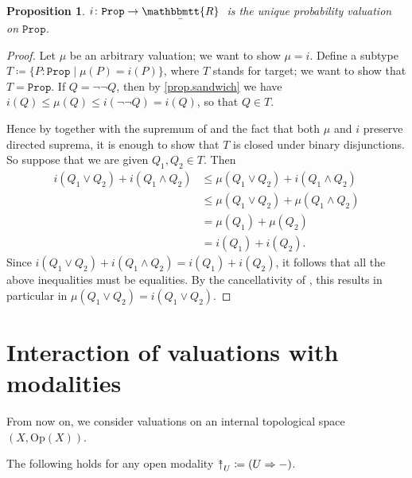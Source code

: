 \documentclass[11pt, oneside, article]{memoir}
\theoremstyle{plain}
\newtheorem{proposition}[theorem]{Proposition}
\theoremstyle{definition}
\theoremstyle{remark}
\newcommand{\const}[1]{\mathtt{#1}}
\newcommand{\Set}[1]{\mathrm{#1}}
\newcommand{\ubar}[1]{\underaccent{\bar}{#1}}
\newcommand{\internal}[1]{\raisebox{-.03ex}{$\mathbbmtt{#1}$}}
\newcommand{\hs}{\hspace{1.1pt}}
\newcommand{\tRR}{\internal{R}\hs}
\newcommand{\tLR}{\ubar{\tRR}\hs}
\newcommand{\Prop}{\const{Prop}}
\newcommand{\Op}{\Set{Op}}
\newcommand{\InSymbol}{{\upclose}}%
\newcommand{\In}[2][]{\InSymbol^{#1}_{#2}}
\newcommand{\upclose}{{\rotatebox[origin=c]{90}{$\twoheadrightarrow$}}}
\newcommand{\imp}{\Rightarrow}
\begin{document}
\begin{proposition}\label{prop.unique_probability_valuation_on_prop}
$i\colon\Prop\to\tLR$ is the unique probability valuation on $\Prop$. 
\end{proposition}

\begin{proof}
Let $\mu$ be an arbitrary valuation; we want to show $\mu=i$. Define a subtype $T\coloneqq\{P:\Prop\mid\mu(P)=i(P)\}$, where $T$ stands for target; we want to show that $T=\Prop$. If $Q = \neg\neg Q$, then by \cref{prop.sandwich} we have $i(Q)\leq\mu(Q)\leq i(\neg\neg Q)=i(Q)$, so that $Q\in T$.

Hence by  together with the supremum of  and the fact that both $\mu$ and $i$ preserve directed suprema, it is enough to show that $T$ is closed under binary disjunctions. So suppose that we are given $Q_1,Q_2\in T$. Then
\begin{align*}
	i(Q_1\vee Q_2)+i(Q_1\wedge Q_2)
	&\leq\mu(Q_1\vee Q_2)+i(Q_1\wedge Q_2)\\
	&\leq \mu(Q_1\vee Q_2)+\mu(Q_1\wedge Q_2)\\
	&=\mu(Q_1)+\mu(Q_2)\\
	&=i(Q_1)+i(Q_2).
\end{align*}
	Since $i(Q_1\vee Q_2)+i(Q_1\wedge Q_2)=i(Q_1)+i(Q_2)$, it follows that all the above inequalities must be equalities. By the cancellativity of , this results in particular in $\mu(Q_1\vee Q_2)=i(Q_1\vee Q_2)$.
\end{proof}



\section{Interaction of valuations with modalities}

From now on, we consider valuations on an internal topological space $(X,\Op(X))$.

The following holds for any open modality $\In{U}\coloneqq (U\imp -)$.

%
\end{document}
